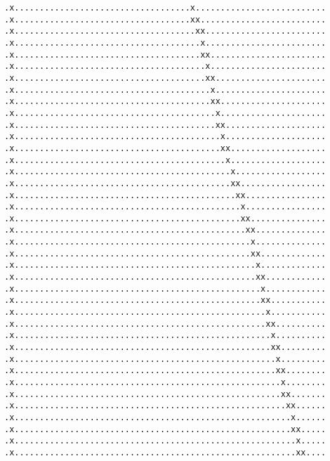 {%
\fontsize{3}{0}%
\selectfont%
\begin{verbatim}.x...................................x..........................
.x...................................xx.........................
.x....................................xx........................
.x.....................................x........................
.x.....................................xx.......................
.x......................................x.......................
.x......................................xx......................
.x.......................................x......................
.x.......................................xx.....................
.x........................................x.....................
.x........................................xx....................
.x.........................................x....................
.x.........................................xx...................
.x..........................................x...................
.x...........................................x..................
.x...........................................xx.................
.x............................................xx................
.x.............................................x................
.x.............................................xx...............
.x..............................................xx..............
.x...............................................x..............
.x...............................................xx.............
.x................................................x.............
.x................................................xx............
.x.................................................x............
.x.................................................xx...........
.x..................................................x...........
.x..................................................xx..........
.x...................................................x..........
.x...................................................xx.........
.x....................................................x.........
.x....................................................xx........
.x.....................................................x........
.x.....................................................xx.......
.x......................................................xx......
.x.......................................................x......
.x.......................................................xx.....
.x........................................................x.....
.x........................................................xx....

\end{verbatim}}
